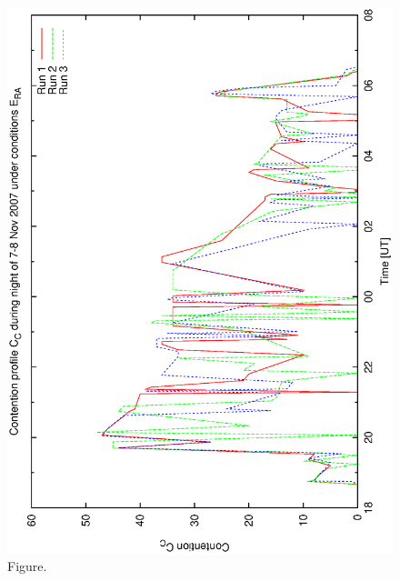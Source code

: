 \documentclass[12pt,a4paper]{article}
\begin{document}
\begin{figure}[htbp]
 \begin{center}
  \includegraphics[scale=1.0, angle=0]{figures/bsb_rnd1_cont.eps}
 \end{center}
  \caption[Figure.]
{Figure.}
\end{figure}
\clearpage
\end{document}
